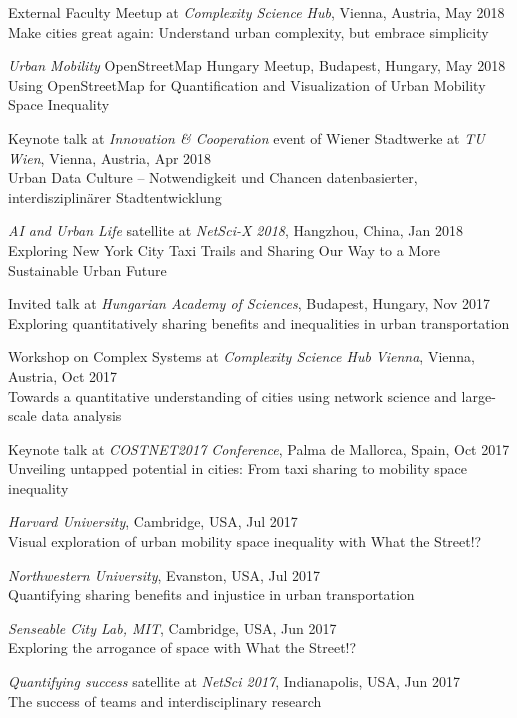 \documentclass[10pt,a4paper]{article}
\renewenvironment{itemize}{
  \begin{list}{}{
    \setlength{\leftmargin}{1.5em}
    \setlength{\itemsep}{0.25em}
    \setlength{\parskip}{0pt}
    \setlength{\parsep}{0.25em}
  }
}{
  \end{list}
}
\begin{document}
\begin{itemize}
\item{External Faculty Meetup at \emph{Complexity Science Hub}, Vienna, Austria, May 2018\\Make cities great again: Understand urban complexity, but embrace simplicity}
\item{\emph{Urban Mobility} OpenStreetMap Hungary Meetup, Budapest, Hungary, May 2018\\Using OpenStreetMap for Quantification and Visualization of Urban Mobility Space Inequality}
\item{Keynote talk at \emph{Innovation \& Cooperation} event of Wiener Stadtwerke at \emph{TU Wien}, Vienna, Austria, Apr 2018\\Urban Data Culture -- Notwendigkeit und Chancen datenbasierter, interdisziplinärer Stadtentwicklung}
\item{\emph{AI and Urban Life} satellite at \emph{NetSci-X 2018}, Hangzhou, China, Jan 2018\\Exploring New York City Taxi Trails and Sharing Our Way to a More Sustainable Urban Future}
\item{Invited talk at \emph{Hungarian Academy of Sciences}, Budapest, Hungary, Nov 2017\\Exploring quantitatively sharing benefits and inequalities in urban transportation}
\item{Workshop on Complex Systems at \emph{Complexity Science Hub Vienna}, Vienna, Austria, Oct 2017\\Towards a quantitative understanding of cities using network science and large-scale data analysis}
\item{Keynote talk at \emph{COSTNET2017 Conference}, Palma de Mallorca, Spain, Oct 2017\\Unveiling untapped potential in cities: From taxi sharing to mobility space inequality}
\item{\emph{Harvard University}, Cambridge, USA, Jul 2017\\Visual exploration of urban mobility space inequality with What the Street!?}
\item{\emph{Northwestern University}, Evanston, USA, Jul 2017\\Quantifying sharing benefits and injustice in urban transportation}
\item{\emph{Senseable City Lab, MIT}, Cambridge, USA, Jun 2017\\Exploring the arrogance of space with What the Street!?}
\item{\emph{Quantifying success} satellite at \emph{NetSci 2017}, Indianapolis, USA, Jun 2017\\The success of teams and interdisciplinary research}

\end{itemize}
\end{document}
